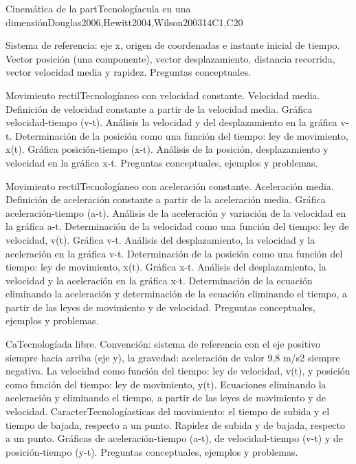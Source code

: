 \begin{syllabus}
\begin{unit}{Cinemática de la partTecnologíacula en una dimensión}{}{Douglas2006,Hewitt2004,Wilson2003}{14}{C1,C20}
\begin{topics}
      \item Sistema de referencia: eje x, origen de coordenadas e instante inicial de tiempo. Vector posición (una componente), vector desplazamiento, distancia recorrida, vector velocidad media y rapidez. Preguntas conceptuales.
      \item Movimiento rectilTecnologíaneo con velocidad constante. Velocidad media. Definición de velocidad constante a partir de la velocidad media. Gráfica velocidad-tiempo (v-t). Análisis la velocidad y del desplazamiento en la gráfica v-t. Determinación de la posición como una función del tiempo: ley de movimiento, x(t). Gráfica posición-tiempo (x-t). Análisis de la posición, desplazamiento y velocidad en la gráfica x-t. Preguntas conceptuales, ejemplos y problemas.
      \item Movimiento rectilTecnologíaneo con aceleración constante. Aceleración media. Definición de aceleración constante a partir de la aceleración media. Gráfica aceleración-tiempo (a-t). Análisis de la aceleración y variación de la velocidad en la gráfica a-t. Determinación de la velocidad como una función del tiempo: ley de velocidad, v(t). Gráfica v-t. Análisis del desplazamiento, la velocidad y la aceleración en la gráfica v-t. Determinación de la posición como una función del tiempo: ley de movimiento, x(t). Gráfica x-t. Análisis del desplazamiento, la velocidad y la aceleración en la gráfica x-t. Determinación de la ecuación eliminando la aceleración y determinación de la ecuación eliminando el tiempo, a partir de las leyes de movimiento y de velocidad. Preguntas conceptuales, ejemplos y problemas.
      \item CaTecnologíada libre. Convención: sistema de referencia con el eje positivo siempre hacia arriba (eje y), la gravedad: aceleración de valor 9,8 m/s2 siempre negativa. La velocidad como función del tiempo: ley de velocidad, v(t), y posición como función del tiempo: ley de movimiento, y(t). Ecuaciones eliminando la aceleración y eliminando el tiempo, a partir de las leyes de movimiento y de velocidad. CaracterTecnologíasticas del movimiento: el tiempo de subida y el tiempo de bajada, respecto a un punto. Rapidez de subida y de bajada, respecto a un punto. Gráficas de aceleración-tiempo (a-t), de velocidad-tiempo (v-t) y de posición-tiempo (y-t). Preguntas conceptuales, ejemplos y problemas.
    \end{topics}
\end{unit}


\end{syllabus}
